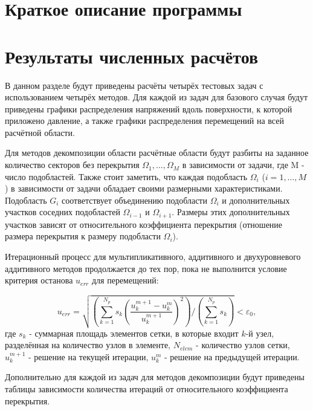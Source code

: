 \documentclass[a4paper]{article}
\begin{document}
\newpage

\section{Краткое описание программы}

\newpage

\section{Результаты численных расчётов}

В данном разделе будут приведены расчёты четырёх тестовых задач с использованием четырёх методов. Для каждой из задач для базового случая будут приведены графики распределения напряжений вдоль поверхности, к которой приложено давление, а также графики распределения перемещений на всей расчётной области.

Для методов декомпозиции области расчётные области будут разбиты на заданное количество секторов без перекрытия $\Omega_1, \ldots, \Omega_M$ в зависимости от задачи, где M - число подобластей. Также стоит заметить, что каждая подобласть $\Omega_i$ ($i = 1,\ldots,M$) в зависимости от задачи обладает своими размерными характеристиками. Подобласть $G_i$ соответствует объединению подобласти $\Omega_i$ и дополнительных участков соседних подобластей $\Omega_{i-1}$ и $\Omega_{i+1}$. Размеры этих дополнительных участков зависят от относительного коэффициента перекрытия (отношение размера перекрытия к размеру подобласти $\Omega_i$).

Итерационный процесс для мультипликативного, аддитивного и двухуровневого аддитивного методов продолжается до тех пор, пока не выполнится условие критерия останова $u_{err}$ для перемещений:

\begin{equation*}
u_{err} = \sqrt{\left(\sum_{k = 1}^{N_p} s_k \left(\frac{u_{k}^{m+1} - u_{k}^{m}}{u_{k}^{m+1}} \right)^2\right) / \left(\sum_{k = 1}^{N_{p}} s_k\right)} < \varepsilon_0,
\end{equation*}
где $s_k$ - суммарная площадь элементов сетки, в которые входит $k$-й узел, разделённая на количество узлов в элементе, $N_{elem}$ - количество узлов сетки, $u_{k}^{m+1}$ - решение на текущей итерации, $u_{k}^{m}$ - решение на предыдущей итерации.

Дополнительно для каждой из задач для методов декомпозиции будут приведены таблицы зависимости количества итераций от относительного коэффициента перекрытия.
\end{document}
